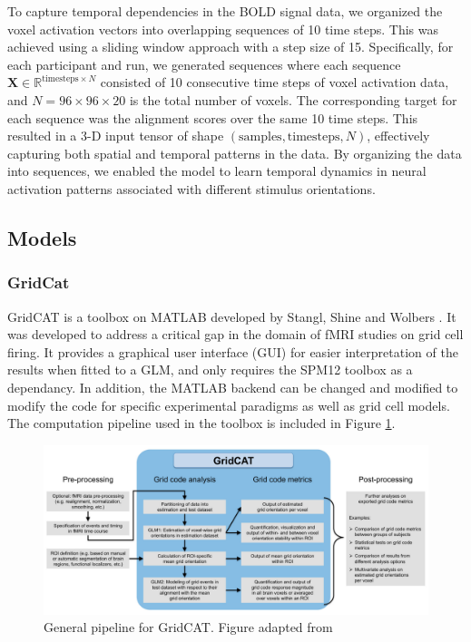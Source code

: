 \documentclass[a4paper]{article}
\begin{document}
To capture temporal dependencies in the BOLD signal data, we organized the voxel activation vectors into overlapping sequences of 10 time steps. This was achieved using a sliding window approach with a step size of 15. Specifically, for each participant and run, we generated sequences where each sequence \( \mathbf{X} \in \mathbb{R}^{\text{timesteps} \times N} \) consisted of 10 consecutive time steps of voxel activation data, and \( N = 96 \times 96 \times 20 \) is the total number of voxels. The corresponding target for each sequence was the alignment scores over the same 10 time steps. This resulted in a 3-D input tensor of shape \( (\text{samples}, \text{timesteps}, N) \), effectively capturing both spatial and temporal patterns in the data. By organizing the data into sequences, we enabled the model to learn temporal dynamics in neural activation patterns associated with different stimulus orientations.

\subsection{Models}
\subsubsection{\textbf{GridCat}}

\noindent GridCAT is a toolbox on MATLAB developed by Stangl, Shine and Wolbers \cite{stangl_gridcat_2017}. It was developed to address a critical gap in the domain of fMRI studies on grid cell firing. It provides a graphical user interface (GUI) for easier interpretation of the results when fitted to a GLM, and only requires the SPM12 toolbox as a dependancy. In addition, the MATLAB backend can be changed and modified to modify the code for specific experimental paradigms as well as grid cell models. The computation pipeline used in the toolbox is included in Figure \ref{fig:gridcat_intro}. 

\begin{figure}
    \centering
    \includegraphics[width=0.8\linewidth]{gridcat_tabular.png}
    \caption{General pipeline for GridCAT. Figure adapted from \cite{stangl_gridcat_2017}}
    \label{fig:gridcat_intro}
\end{figure}
\end{document}
